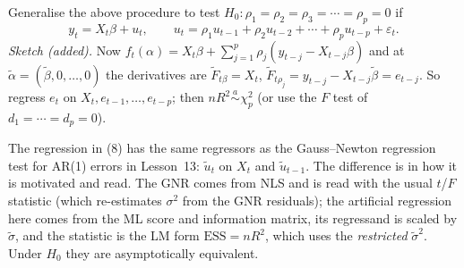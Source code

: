 \documentclass[11pt]{article}
\begin{document}
 Generalise the above procedure to test $H_{0}\colon\rho_{1}=\rho_{2}=\rho_{3}=\cdots=\rho_{p}=0$ if
\[ y_{t}=X_{t}\beta+u_{t},\qquad u_{t}=\rho_{1}u_{t-1}+\rho_{2}u_{t-2}+\cdots+\rho_{p}u_{t-p}+\varepsilon_{t}. \]
\emph{Sketch (added).} Now $f_{t}(\alpha)=X_{t}\beta+\sum_{j=1}^{p}\rho_{j}(y_{t-j}-X_{t-j}\beta)$ and at
$\tilde\alpha=(\tilde\beta,0,\dots,0)$ the derivatives are $\tilde F_{t\beta}=X_{t}$,
$\tilde F_{t\rho_{j}}=y_{t-j}-X_{t-j}\tilde\beta=e_{t-j}$. So regress $e_{t}$ on $X_{t},e_{t-1},\dots,e_{t-p}$;
then $nR^{2}\overset{a}{\sim}\chi^{2}_{p}$ (or use the $F$ test of $d_{1}=\cdots=d_{p}=0$).

 The regression in (8) has the same regressors as the Gauss--Newton
regression test for AR(1) errors in Lesson~13: $\tilde u_{t}$ on $X_{t}$ and $\tilde u_{t-1}$. The difference is
in how it is motivated and read. The GNR comes from NLS and is read with the usual $t$/$F$ statistic
(which re-estimates $\sigma^{2}$ from the GNR residuals); the artificial regression here comes from the ML
score and information matrix, its regressand is scaled by $\tilde\sigma$, and the statistic is the LM form
$\mathrm{ESS}=nR^{2}$, which uses the \emph{restricted} $\tilde\sigma^{2}$. Under $H_{0}$ they are asymptotically
equivalent.
\end{document}
